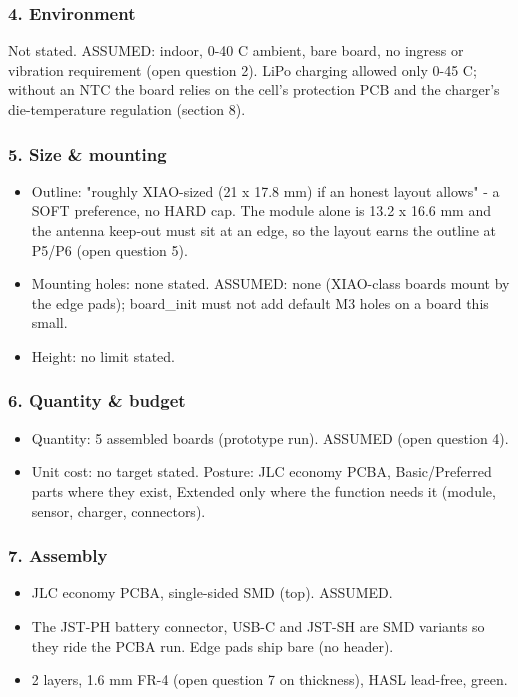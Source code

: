 \documentclass[11pt]{article}
\begin{document}
\subsubsection*{4. Environment}
Not stated. ASSUMED: indoor, 0-40 C ambient, bare board, no ingress or vibration requirement (open question 2). LiPo charging allowed only 0-45 C; without an NTC the board relies on the cell's protection PCB and the charger's die-temperature regulation (section 8).

\subsubsection*{5. Size \& mounting}
\begin{itemize}
\item Outline: "roughly XIAO-sized (21 x 17.8 mm) if an honest layout allows" -
a SOFT preference, no HARD cap. The module alone is 13.2 x 16.6 mm and the
antenna keep-out must sit at an edge, so the layout earns the outline at
P5/P6 (open question 5).
\item Mounting holes: none stated. ASSUMED: none (XIAO-class boards mount by the
edge pads); board\_init must not add default M3 holes on a board this small.
\item Height: no limit stated.
\end{itemize}
\subsubsection*{6. Quantity \& budget}
\begin{itemize}
\item Quantity: 5 assembled boards (prototype run). ASSUMED (open question 4).
\item Unit cost: no target stated. Posture: JLC economy PCBA, Basic/Preferred
parts where they exist, Extended only where the function needs it (module,
sensor, charger, connectors).
\end{itemize}
\subsubsection*{7. Assembly}
\begin{itemize}
\item JLC economy PCBA, single-sided SMD (top). ASSUMED.
\item The JST-PH battery connector, USB-C and JST-SH are SMD variants so they ride
the PCBA run. Edge pads ship bare (no header).
\item 2 layers, 1.6 mm FR-4 (open question 7 on thickness), HASL lead-free, green.
\end{itemize}
\end{document}
